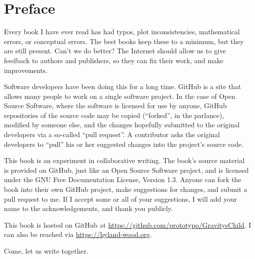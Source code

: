 % 
% 

\chapter*{Preface}

Every book I have ever read has had typos, plot inconsistencies, mathematical errors, or conceptual errors. The best books keep these to a minimum, but they are still present. Can't we do better? The Internet should allow us to give feedback to authors and publishers, so they can fix their work, and make improvements.

Software developers have been doing this for a long time. GitHub is a site that allows many people to work on a single software project. In the case of Open Source Software, where the software is licensed for use by anyone, GitHub repositories of the source code may be copied (``forked'', in the parlance), modified by someone else, and the changes hopefully submitted to the original developers via a so-called ``pull request''. A contributor asks the original developers to ``pull'' his or her suggested changes into the project's source code.

This book is an experiment in collaborative writing. The book's source material is provided on GitHub, just like an Open Source Software project, and is licensed under the GNU Free Documentation License, Version 1.3. Anyone can fork the book into their own GitHub project, make suggestions for changes, and submit a pull request to me. If I accept some or all of your suggestions, I will add your name to the acknowledgements, and thank you publicly.

This book is hosted on GitHub at \url{https://github.com/prototypo/GravitysChild}. I can also be reached via \url{https://hyland-wood.org}.

Come, let us write together.




\newpage
\thispagestyle{empty}
